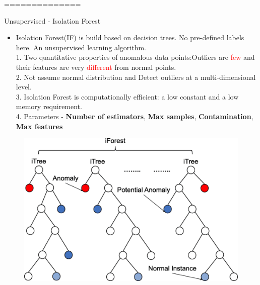 \documentclass[
 size=14pt,
 paper=smartboard,  %
 mode=present, 		%
 display=slides, 	%
 style=tuliplab,  	%
 pauseslide,
 fleqn,leqno]{powerdot}
\begin{document}
==============
\begin{slide}[toc=,bm=]{Unsupervised - Isolation Forest}
	\begin{itemize}
		\item
		Isolation Forest(IF) is build based on decision trees. No pre-defined labels here. An unsupervised learning algorithm.\\
		1. Two quantitative properties of anomalous data points:Outliers are \textcolor{red} {few} and their features are very \textcolor{red} {different} from normal points.\\
		2. Not assume normal distribution and Detect outliers at a multi-dimensional level. \\
		3. Isolation Forest is computationally efficient: a low constant and a low memory requirement.	\\
		4. Parameters - \textbf{Number of estimators}, \textbf{Max samples}, \textbf{Contamination}, \textbf{Max features}
\end{itemize}

	\begin{figure}
		\centering
		\includegraphics[scale=0.2]{iforest.eps}
	\end{figure}
\end{slide}
\end{document}
